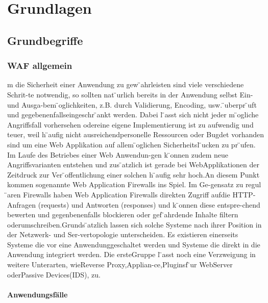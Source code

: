 \chapter{Grundlagen}


\section{Grundbegriffe}
\subsection{WAF allgemein}
m die Sicherheit einer Anwendung zu gew ̈ahrleisten sind viele verschiedene Schrit-te  notwendig,  so  sollten  nat ̈urlich  bereits  in  der  Anwendung  selbst  Ein-  und  Ausga-bem ̈oglichkeiten, z.B. durch Validierung, Encoding, usw. ̈uberpr ̈uft und gegebenenfallseingeschr ̈ankt werden. Dabei l ̈asst sich nicht jeder m ̈ogliche Angriffsfall vorhersehen odereine eigene Implementierung ist zu aufwendig und teuer, weil h ̈aufig nicht ausreichendpersonelle Ressourcen  oder  Bugdet vorhanden  sind um eine  Web  Applikation auf  allem ̈oglichen  Sicherheitsl ̈ucken  zu  pr ̈ufen.  Im  Laufe  des  Betriebes  einer  Web  Anwendun-gen k ̈onnen zudem neue Angriffsvarianten entstehen und zus ̈atzlich ist gerade bei WebApplikationen der Zeitdruck zur Ver ̈offentlichung einer solchen h ̈aufig sehr hoch.An diesem Punkt kommen sogenannte Web Application Firewalls ins Spiel. Im Ge-gensatz  zu  regul ̈aren  Firewalls  haben  Web  Application  Firewalls  direkten  Zugriff  aufdie  HTTP-Anfragen  (requests)  und  Antworten  (responses)  und  k ̈onnen  diese  entspre-chend  bewerten  und  gegenbenenfalls  blockieren  oder  gef ̈ahrdende  Inhalte  filtern  oderumschreiben.Grunds ̈atzlich lassen sich solche Systeme nach ihrer Position in der Netzwerk- und Ser-vertopologie  unterscheiden.  Es  existieren  einerseits  Systeme  die  vor  eine  Anwendunggeschaltet werden und Systeme die direkt in die Anwendung integriert werden. Die ersteGruppe l ̈asst noch eine Verzweigung in weitere Unterarten, wieReverse Proxy,Applian-ce,Pluginsf ̈ur WebServer oderPassive Devices(IDS), zu.

\subsubsection{Anwendungsfälle}

